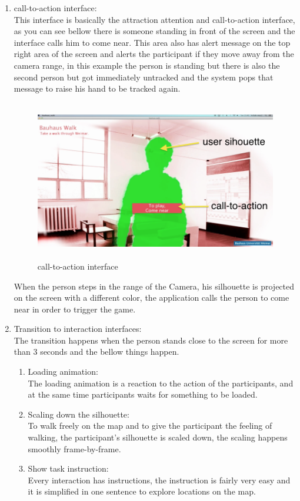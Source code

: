 \begin{enumerate}

\item call-to-action interface: \\

This interface is basically the attraction attention and call-to-action interface, as you can see bellow there is someone standing in front of the screen and the interface calls him to come near. This area also has alert message on the top right area of the screen and alerts the participant if they move away from the camera range, in this example the person is standing but there is also the second person but got immediately untracked and the system pops that message to raise his hand to be tracked again.

\begin{figure}[H]
    \centering
    \includegraphics[width=120mm,height=70mm]{Figures/6/body/first_interface}
    \caption{call-to-action interface}%
    \label{fig:body_firstinterface}%
\end{figure}

When the person steps in the range of the Camera, his silhouette is projected on the screen with a different color, the application calls the person to come near in order to trigger the game.

\item Transition to interaction interfaces: \\
The transition happens when the person stands close to the screen for more than 3 seconds and the bellow things happen.

\begin{enumerate}
\item Loading animation:\\
  The loading animation is a reaction to the action of the participants, and at the same time participants waits for something to be loaded.
\item Scaling down the silhouette: \\
To walk freely on the map and to give the participant the feeling of walking, the participant's silhouette is scaled down, the scaling happens smoothly frame-by-frame.
\item Show task instruction:  \\
Every interaction has instructions, the instruction is fairly very easy and it is simplified in one sentence to explore locations on the map.
\end{enumerate}


\end{enumerate}
